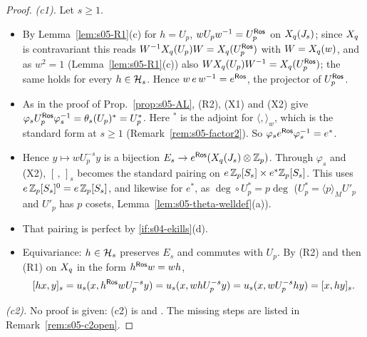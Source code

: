 \begin{proof}
\emph{(c1).} Let $s\ge1$.
\begin{itemize}
\item By Lemma~\ref{lem:s05-R1}(c) for $h=U_p$, $wU_pw^{-1}=U_p^{\mathsf{Ros}}$ on $X_q(J_s)$; since $X_q$ is contravariant this reads $W^{-1}X_q(U_p)W=X_q(U_p^{\mathsf{Ros}})$ with
  $W=X_q(w)$, and as $w^2=1$ (Lemma~\ref{lem:s05-R1}(c)) also $WX_q(U_p)W^{-1}=X_q(U_p^{\mathsf{Ros}})$; the same holds for every $h\in\mathcal{H}_s$. Hence $w\,e\,w^{-1}=e^{\mathsf{Ros}}$, the projector of $U_p^{\mathsf{Ros}}$.
\item As in the proof of Prop.~\ref{prop:s05-AL}, (R2), (X1) and (X2) give $\varphi_sU_p^{\mathsf{Ros}}\varphi_s^{-1}=\theta_s(U_p)^*=U_p^*$. Here $^*$ is the adjoint for
  $\langle,\rangle_w$, which is the standard form at $s\ge1$ (Remark~\ref{rem:s05-factor2}). So $\varphi_s e^{\mathsf{Ros}}\varphi_s^{-1}=e^*$.
\item Hence $y\mapsto wU_p^{-s}y$ is a bijection $E_s\to e^{\mathsf{Ros}}(X_q(J_s)\otimes\mathbb{Z}_p)$. Through $\varphi_s$ and (X2), $[\,,\,]_s$ becomes the standard pairing on
  $e\,\mathbb{Z}_p[S_s]\times e^*\mathbb{Z}_p[S_s]$. This uses $e\,\mathbb{Z}_p[S_s]^0=e\,\mathbb{Z}_p[S_s]$, and likewise for $e^*$, as $\deg\circ U_p^*=p\deg$ ($U_p^*=\langle p\rangle_MU'_p$ and $U'_p$ has $p$ cosets, Lemma~\ref{lem:s05-theta-welldef}(a)).
\item That pairing is perfect by \ref{if:s04-ekills}(d).
\item Equivariance: $h\in\mathcal{H}_s$ preserves $E_s$ and commutes with $U_p$. By (R2) and then (R1) on $X_q$ in the form $h^{\mathsf{Ros}} w=wh$,
  \[[hx,y]_s=u_s(x,h^{\mathsf{Ros}} wU_p^{-s}y)=u_s(x,whU_p^{-s}y)=u_s(x,wU_p^{-s}hy)=[x,hy]_s.\]
\end{itemize}

\emph{(c2).} No proof is given: (c2) is \stconj{} and \stopen. The missing steps are listed in Remark~\ref{rem:s05-c2open}.


\end{proof}

